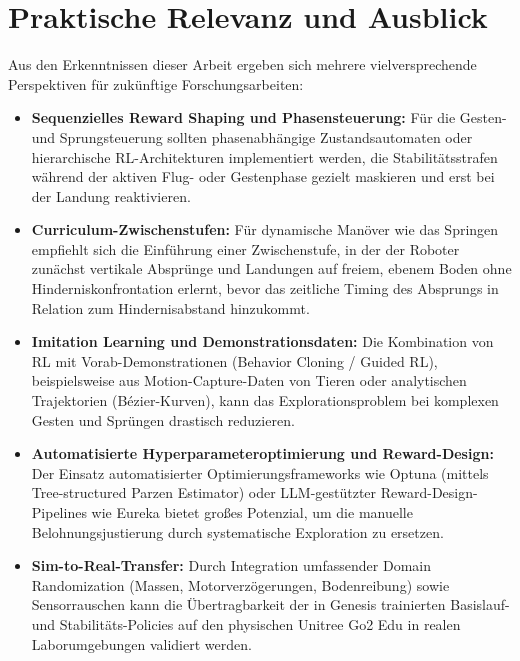 \section{Praktische Relevanz und Ausblick}

Aus den Erkenntnissen dieser Arbeit ergeben sich mehrere vielversprechende Perspektiven für zukünftige Forschungsarbeiten:
\begin{itemize}
	\item \textbf{Sequenzielles Reward Shaping und Phasensteuerung:} Für die Gesten- und Sprungsteuerung sollten phasenabhängige Zustandsautomaten oder hierarchische RL-Architekturen implementiert werden, die Stabilitätsstrafen während der aktiven Flug- oder Gestenphase gezielt maskieren und erst bei der Landung reaktivieren.
	\item \textbf{Curriculum-Zwischenstufen:} Für dynamische Manöver wie das Springen empfiehlt sich die Einführung einer Zwischenstufe, in der der Roboter zunächst vertikale Absprünge und Landungen auf freiem, ebenem Boden ohne Hinderniskonfrontation erlernt, bevor das zeitliche Timing des Absprungs in Relation zum Hindernisabstand hinzukommt.
	\item \textbf{Imitation Learning und Demonstrationsdaten:} Die Kombination von RL mit Vorab-Demonstrationen (Behavior Cloning / Guided RL), beispielsweise aus Motion-Capture-Daten von Tieren oder analytischen Trajektorien (Bézier-Kurven), kann das Explorationsproblem bei komplexen Gesten und Sprüngen drastisch reduzieren.
	\item \textbf{Automatisierte Hyperparameteroptimierung und Reward-Design:} Der Einsatz automatisierter Optimierungsframeworks wie Optuna (mittels Tree-structured Parzen Estimator) oder LLM-gestützter Reward-Design-Pipelines wie Eureka bietet großes Potenzial, um die manuelle Belohnungsjustierung durch systematische Exploration zu ersetzen.
	\item \textbf{Sim-to-Real-Transfer:} Durch Integration umfassender Domain Randomization (Massen, Motorverzögerungen, Bodenreibung) sowie Sensorrauschen kann die Übertragbarkeit der in Genesis trainierten Basislauf- und Stabilitäts-Policies auf den physischen Unitree Go2 Edu in realen Laborumgebungen validiert werden.
\end{itemize}